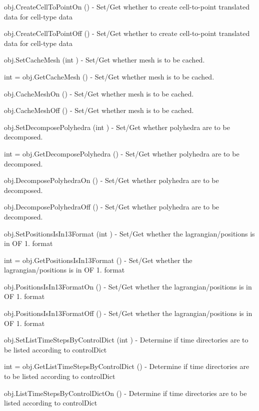 \begin{DoxyItemize}
\item {\ttfamily obj.\-Create\-Cell\-To\-Point\-On ()} -\/ Set/\-Get whether to create cell-\/to-\/point translated data for cell-\/type data  
\item {\ttfamily obj.\-Create\-Cell\-To\-Point\-Off ()} -\/ Set/\-Get whether to create cell-\/to-\/point translated data for cell-\/type data  
\item {\ttfamily obj.\-Set\-Cache\-Mesh (int )} -\/ Set/\-Get whether mesh is to be cached.  
\item {\ttfamily int = obj.\-Get\-Cache\-Mesh ()} -\/ Set/\-Get whether mesh is to be cached.  
\item {\ttfamily obj.\-Cache\-Mesh\-On ()} -\/ Set/\-Get whether mesh is to be cached.  
\item {\ttfamily obj.\-Cache\-Mesh\-Off ()} -\/ Set/\-Get whether mesh is to be cached.  
\item {\ttfamily obj.\-Set\-Decompose\-Polyhedra (int )} -\/ Set/\-Get whether polyhedra are to be decomposed.  
\item {\ttfamily int = obj.\-Get\-Decompose\-Polyhedra ()} -\/ Set/\-Get whether polyhedra are to be decomposed.  
\item {\ttfamily obj.\-Decompose\-Polyhedra\-On ()} -\/ Set/\-Get whether polyhedra are to be decomposed.  
\item {\ttfamily obj.\-Decompose\-Polyhedra\-Off ()} -\/ Set/\-Get whether polyhedra are to be decomposed.  
\item {\ttfamily obj.\-Set\-Positions\-Is\-In13\-Format (int )} -\/ Set/\-Get whether the lagrangian/positions is in O\-F 1. format  
\item {\ttfamily int = obj.\-Get\-Positions\-Is\-In13\-Format ()} -\/ Set/\-Get whether the lagrangian/positions is in O\-F 1. format  
\item {\ttfamily obj.\-Positions\-Is\-In13\-Format\-On ()} -\/ Set/\-Get whether the lagrangian/positions is in O\-F 1. format  
\item {\ttfamily obj.\-Positions\-Is\-In13\-Format\-Off ()} -\/ Set/\-Get whether the lagrangian/positions is in O\-F 1. format  
\item {\ttfamily obj.\-Set\-List\-Time\-Steps\-By\-Control\-Dict (int )} -\/ Determine if time directories are to be listed according to control\-Dict  
\item {\ttfamily int = obj.\-Get\-List\-Time\-Steps\-By\-Control\-Dict ()} -\/ Determine if time directories are to be listed according to control\-Dict  
\item {\ttfamily obj.\-List\-Time\-Steps\-By\-Control\-Dict\-On ()} -\/ Determine if time directories are to be listed according to control\-Dict  

\end{DoxyItemize}
